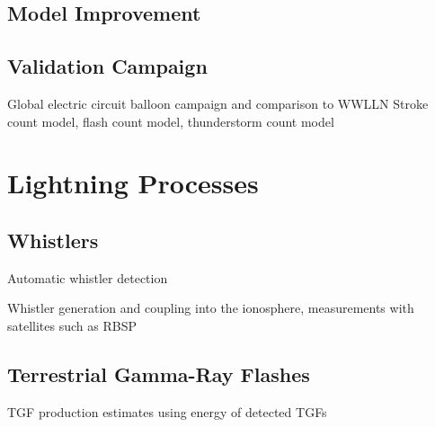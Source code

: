 \subsection{Model Improvement}

\subsection{Validation Campaign}

Global electric circuit balloon campaign and comparison to WWLLN
  Stroke count model, flash count model, thunderstorm count model

\section{Lightning Processes}

\subsection{Whistlers}

  Automatic whistler detection

Whistler generation and coupling into the ionosphere, measurements with satellites such as RBSP

\subsection{Terrestrial Gamma-Ray Flashes}

 TGF production estimates using energy of detected TGFs





